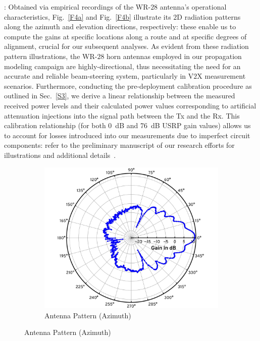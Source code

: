 \documentclass[12pt, draftcls, onecolumn]{IEEEtran}
\begin{document}
{: Obtained via empirical recordings of the WR-$28$ antenna's operational characteristics, Fig.~\ref{F4a} and Fig.~\ref{F4b} illustrate its $2$D radiation patterns along the azimuth and elevation directions, respectively: these enable us to compute the gains at specific locations along a route and at specific degrees of alignment, crucial for our subsequent analyses. As evident from these radiation pattern illustrations, the WR-$28$ horn antennas employed in our propagation modeling campaign are highly-directional, thus necessitating the need for an accurate and reliable beam-steering system, particularly in V$2$X measurement scenarios. Furthermore, conducting the pre-deployment calibration procedure as outlined in Sec.~\ref{S3}, we derive a linear relationship between the measured received power levels and their calculated power values corresponding to artificial attenuation injections into the signal path between the Tx and the Rx. This calibration relationship (for both \SI{0}{\deci\bel} and \SI{76}{\deci\bel} USRP gain values) allows us to account for losses introduced into our measurements due to imperfect circuit components: refer to the preliminary manuscript of our research efforts for illustrations and additional details~\cite{SPAVE_ICC}.
\begin{figure} [t]
     \centering
     \begin{subfigure}{0.494\linewidth}
         \centering
         \includegraphics[width=1.0\linewidth]{figs/antenna_pattern_az.pdf}
         \caption{Antenna Pattern (Azimuth)}

\end{subfigure}
\end{figure}}
\end{document}
